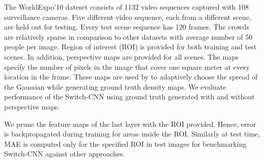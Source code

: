 \documentclass[10pt,twocolumn,letterpaper]{article}
\begin{document}
\begin{table}[!t]
\centering
\vspace{-0.2cm}

\vspace*{1.2mm}
\caption{Comparison of Switch-CNN with other state-of-the-art crowd counting methods on WorldExpo'10 dataset~\cite{zhang2015cross}. Mean Absolute Error (MAE) for individual test scenes and average performance across scenes is shown.}
\label{wexpo}
\end{table}


The WorldExpo'10 dateset consists of 1132 video sequences captured with 108 surveillance cameras. Five different video sequence, each from a different scene, are held out for testing. Every test scene sequence has 120 frames. The crowds are relatively sparse in comparison to other datasets with average number of 50 people per image. Region of interest (ROI) is provided for both training and test scenes. In addition, perspective maps are provided for all scenes. The maps specify the number of pixels in the image that cover one square meter at every location in the frame. These maps are used by \cite{zhang2016single,zhang2015cross} to adaptively choose the spread of the Gaussian while generating ground truth density maps. We evaluate performance of the Switch-CNN using ground truth generated with and without perspective maps. 

We prune the feature maps of the last layer with the ROI provided. Hence, error is backpropagated during training for areas inside the ROI. Similarly at test time, MAE is computed only for the specified ROI in test images for benchmarking Switch-CNN against other approaches.
\end{document}
